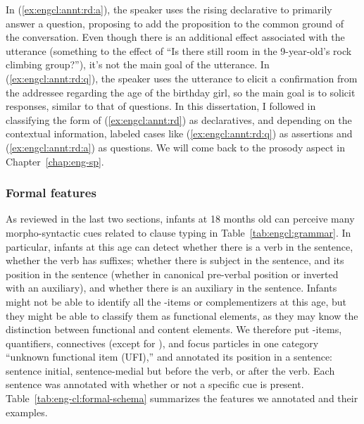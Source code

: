 In (\ref{ex:engcl:annt:rd:a}), the speaker uses the rising declarative to primarily answer a question, proposing to add the proposition  to the common ground of the conversation. Even though there is an additional effect associated with the utterance (something to the effect of ``Is there still room in the 9-year-old’s rock climbing group?''), it's not the main goal of the utterance. In (\ref{ex:engcl:annt:rd:q}), the speaker uses the utterance to elicit a confirmation from the addressee regarding the age of the birthday girl, so the main goal is to solicit responses, similar to that of questions. In this dissertation, I followed \textcite{goodhue2021rd} in classifying the form of (\ref{ex:engcl:annt:rd}) as declaratives, and depending on the contextual information, labeled cases like (\ref{ex:engcl:annt:rd:q}) as assertions and (\ref{ex:engcl:annt:rd:a}) as questions. We will come back to the prosody aspect in Chapter~\ref{chap:eng-sp}.

\subsubsection{Formal features}

As reviewed in the last two sections, infants at 18 months old can perceive many morpho-syntactic cues related to clause typing in Table~\ref{tab:engcl:grammar}. In particular, infants at this age can detect whether there is a verb in the sentence, whether the verb has suffixes; whether there is subject in the sentence, and its position in the sentence (whether in canonical pre-verbal position or inverted with an auxiliary), and whether there is an auxiliary in the sentence. Infants might not be able to identify all the \twh-items or complementizers at this age, but they might be able to classify them as functional elements, as they may know the distinction between functional and content elements. We therefore put \twh-items, quantifiers, connectives (except for ), and focus particles in one category ``unknown functional item (UFI),'' and annotated its position in a sentence: sentence initial, sentence-medial but before the verb, or after the verb. Each sentence was annotated with whether or not a specific cue is present. Table~\ref{tab:eng-cl:formal-schema} summarizes the features we annotated and their examples.  


